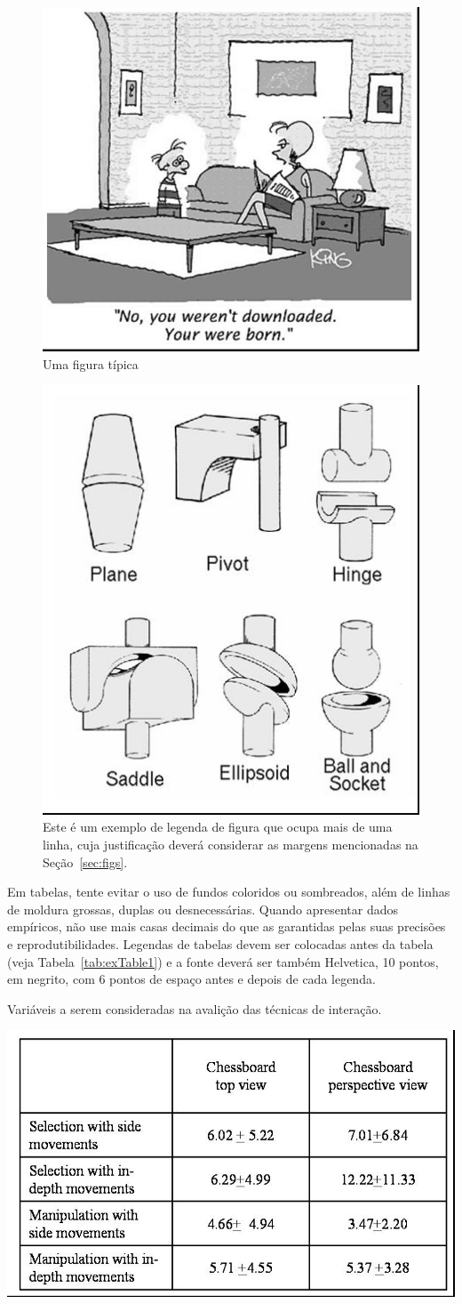 \documentclass[11.5pt]{article}
\begin{document}
\begin{figure}[ht]
\centering
\includegraphics[width=.5\textwidth]{fig1.jpg}
\caption{Uma figura típica}
\label{fig:exampleFig1}
\end{figure}

\begin{figure}[ht]
\centering
\includegraphics[width=.3\textwidth]{fig2.jpg}
\caption{Este é um exemplo de legenda de figura que ocupa mais de uma linha, cuja justificação deverá considerar as margens mencionadas na Seção~\ref{sec:figs}.}
\label{fig:exampleFig2}
\end{figure}

Em tabelas, tente evitar o uso de fundos coloridos ou sombreados, além de linhas de moldura grossas, duplas ou desnecessárias. Quando apresentar dados empíricos, não use mais casas decimais do que as garantidas pelas suas precisões e reprodutibilidades. Legendas de tabelas devem ser colocadas antes da tabela (veja Tabela~\ref{tab:exTable1}) e a fonte deverá ser também Helvetica, 10 pontos, em negrito, com 6 pontos de espaço antes e depois de cada legenda.


\begin{table}[ht]
\centering
\caption{Variáveis a serem consideradas na avalição das técnicas de interação.}
\label{tab:exTable1}
\includegraphics[width=.7\textwidth]{table.jpg}
\end{table}
\end{document}
